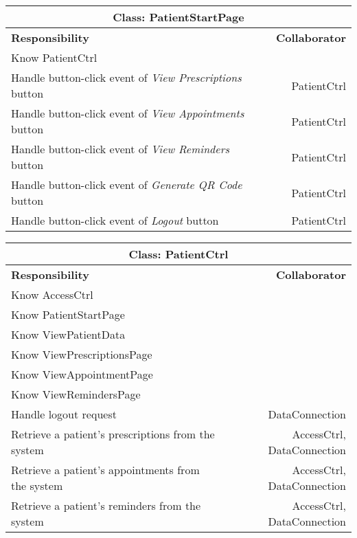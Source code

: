 \documentclass[12pt]{article}
\begin{document}
\begin{center}
\begin{tabularx}{\textwidth}{|X|r|} \hline
\multicolumn{2}{|c|}{\textbf{Class: PatientStartPage}}\\ \hline
\textbf{Responsibility} & \textbf{Collaborator} \\ \hline
Know PatientCtrl & \\ \hline
Handle button-click event of \emph{View Prescriptions} button & PatientCtrl \\ \hline
Handle button-click event of \emph{View Appointments} button & PatientCtrl \\ \hline
Handle button-click event of \emph{View Reminders} button & PatientCtrl \\ \hline
Handle button-click event of \emph{Generate QR Code} button & PatientCtrl \\ \hline
Handle button-click event of \emph{Logout} button & PatientCtrl \\ \hline
\end{tabularx}
\newline\newline
\end{center}



\begin{center}
\begin{tabularx}{\textwidth}{|X|r|} \hline
\multicolumn{2}{|c|}{\textbf{Class: PatientCtrl}}\\ \hline
\textbf{Responsibility} & \textbf{Collaborator} \\ \hline
Know AccessCtrl                             &                                  \\ \hline 
Know PatientStartPage                  &                             \\ \hline
Know ViewPatientData                  &                             \\ \hline
Know ViewPrescriptionsPage                                &                                 \\ \hline
Know ViewAppointmentPage                                  &                                 \\ \hline
Know ViewRemindersPage                                   &                                 \\ \hline
Handle logout request                                 &  DataConnection                                 \\ \hline
Retrieve a patient's prescriptions from the system & AccessCtrl, DataConnection\\ \hline
Retrieve a patient's appointments from the system & AccessCtrl, DataConnection\\ \hline
Retrieve a patient's reminders from the system & AccessCtrl, DataConnection\\ \hline
\end{tabularx}
\newline\newline
\end{center}
\end{document}
